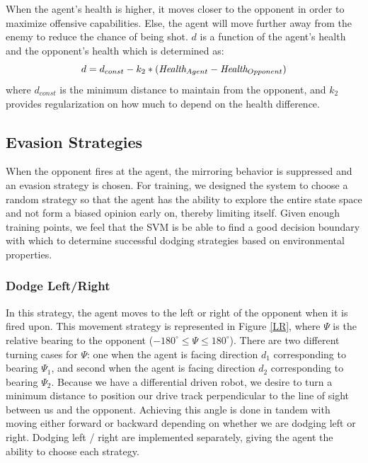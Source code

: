 \documentclass{article}
\theoremstyle{plain}
\theoremstyle{definition}
\theoremstyle{remark}
\begin{document}
When the agent's health is higher, it moves closer to the opponent in order to maximize offensive capabilities. Else, the agent will move further away from the enemy to reduce the chance of being shot. $d$ is a function of the agent's health and the opponent's health which is determined as:
$$d = d_{const} - k_2*(\emph{Health}_{Agent} - \emph{Health}_{Opponent})$$
where $d_{const}$ is the minimum distance to maintain from the opponent, and $k_2$ provides regularization on how much to depend on the health difference.


\subsection*{Evasion Strategies}
When the opponent fires at the agent, the mirroring behavior is suppressed and an evasion strategy is chosen. For training, we designed the system to choose a random strategy so that the agent has the ability to explore the entire state space and not form a biased opinion early on, thereby limiting itself. Given enough training points, we feel that the SVM is be able to find a good decision boundary with which to determine successful dodging strategies based on environmental properties. 

\subsubsection*{Dodge Left/Right}
In this strategy, the agent moves to the left or right of the opponent when it is fired upon. This movement strategy is represented in Figure \ref{LR}, where $\Psi$ is the relative bearing to the opponent ($-180^{\circ} \leq \Psi \leq 180^{\circ}$). There are two different turning cases for $\Psi$: one when the agent is facing direction $d_1$ corresponding to bearing $\Psi_1$, and second when the agent is facing direction $d_2$ corresponding to bearing $\Psi_2$. Because we have a differential driven robot, we desire to turn a minimum distance to position our drive track perpendicular to the line of sight between us and the opponent. Achieving this angle is done in tandem with moving either forward or backward depending on whether we are dodging left or right. Dodging left / right are implemented separately, giving the agent the ability to choose each strategy.\\
\end{document}
